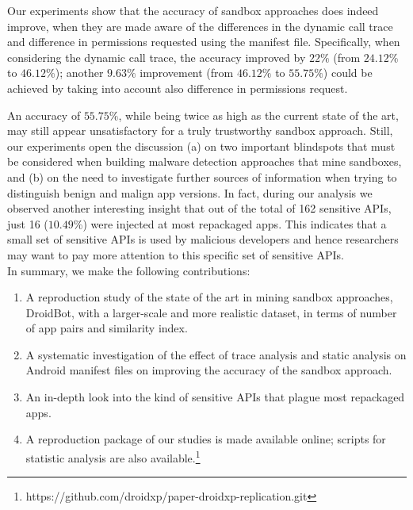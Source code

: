 Our experiments show that the accuracy of sandbox approaches does indeed improve, when they are made aware of the differences in the dynamic call trace and difference in permissions requested using the manifest file. Specifically, when considering the dynamic call trace, the accuracy improved by $22\%$ (from $24.12\%$ to $46.12\%$); another $9.63\%$ improvement (from $46.12\%$ to $55.75\%$) could be achieved by taking into account also difference in permissions request. 

An accuracy of $55.75\%$, while being twice as high as the current state of the art, may still appear unsatisfactory for a truly trustworthy sandbox approach. Still, 
our experiments open the discussion (a) on two important blindspots that must be considered when building 
malware detection approaches that mine sandboxes, and (b) on the need to investigate further sources of information when trying to distinguish benign and malign app versions. 
In fact, during our analysis we observed another interesting insight that out of the total of 162 sensitive 
APIs, just 16 ($10.49$\%) were injected at most repackaged apps. 
This indicates that a small set of sensitive APIs is used by malicious developers and hence 
researchers may want to pay more attention to this specific set of sensitive APIs.\\


\noindent
In summary, we make the following contributions:

\begin{enumerate}[1.]
\item A reproduction study of the state of the art in mining sandbox approaches, DroidBot, 
with a larger-scale and more realistic dataset, in terms of number of app pairs and similarity index.
\item A systematic investigation of the effect of trace analysis and static analysis on Android manifest files 
on improving the accuracy of the sandbox approach.
\item An in-depth look into the kind of sensitive APIs that plague most repackaged apps.
\item A reproduction package of our studies is made available online; scripts for statistic analysis are also available.\footnote{https://github.com/droidxp/paper-droidxp-replication.git}
\end{enumerate}


